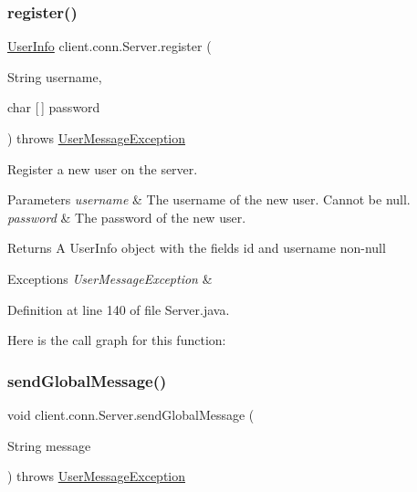 \subsubsection{\texorpdfstring{register()}{register()}}
{\footnotesize\ttfamily \hyperlink{classpt_1_1up_1_1fe_1_1lpro1613_1_1sharedlib_1_1tuples_1_1_user_info}{User\+Info} client.\+conn.\+Server.\+register (\begin{DoxyParamCaption}\item[{String}]{username,  }\item[{char \mbox{[}$\,$\mbox{]}}]{password }\end{DoxyParamCaption}) throws \hyperlink{classpt_1_1up_1_1fe_1_1lpro1613_1_1sharedlib_1_1exceptions_1_1_user_message_exception}{User\+Message\+Exception}}

Register a new user on the server. 
\begin{DoxyParams}{Parameters}
{\em username} & The username of the new user. Cannot be null. \\
\hline
{\em password} & The password of the new user. \\
\hline
\end{DoxyParams}
\begin{DoxyReturn}{Returns}
A {\ttfamily User\+Info} object with the fields {\ttfamily id} and {\ttfamily username} non-\/null 
\end{DoxyReturn}

\begin{DoxyExceptions}{Exceptions}
{\em User\+Message\+Exception} & \\
\hline
\end{DoxyExceptions}


Definition at line 140 of file Server.\+java.

Here is the call graph for this function\+:
\hypertarget{classclient_1_1conn_1_1_server_acbe845e1fc6ba7857fcf6d01377f5432}{}\label{classclient_1_1conn_1_1_server_acbe845e1fc6ba7857fcf6d01377f5432} 
\subsubsection{\texorpdfstring{send\+Global\+Message()}{sendGlobalMessage()}}
{\footnotesize\ttfamily void client.\+conn.\+Server.\+send\+Global\+Message (\begin{DoxyParamCaption}\item[{String}]{message }\end{DoxyParamCaption}) throws \hyperlink{classpt_1_1up_1_1fe_1_1lpro1613_1_1sharedlib_1_1exceptions_1_1_user_message_exception}{User\+Message\+Exception}}

